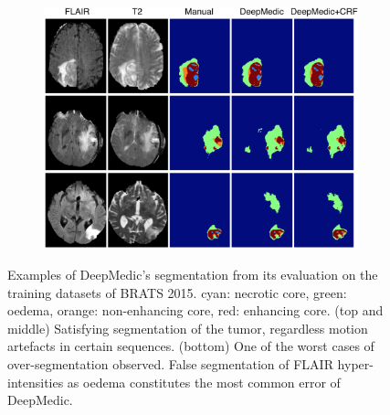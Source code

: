 \begin{figure}[!h]
\centering
\begin{subfigure}[b]{1.0\textwidth}
	\centering
	\includegraphics[clip=true, trim=0pt 0pt 0pt 0pt, width=1.0\textwidth]{figures/evaluationSection/brats/qualitative/bratsQualitatively.png}
\end{subfigure}
\vspace{-0pt} %
\caption{Examples of DeepMedic's segmentation from its evaluation on the training datasets of BRATS 2015. cyan: necrotic core, green: oedema, orange: non-enhancing core, red: enhancing core. (top and middle) Satisfying segmentation of the tumor, regardless motion artefacts in certain sequences. (bottom) One of the worst cases of over-segmentation observed. False segmentation of FLAIR hyper-intensities as oedema constitutes the most common error of DeepMedic.}
\label{fig:evalBratsVisualQuality}
\end{figure}
